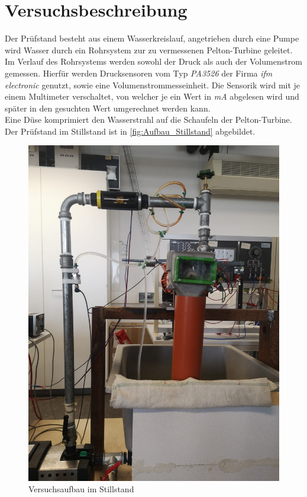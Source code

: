 \section{Versuchsbeschreibung}
\label{section:Versuchsbeschreibung}
%
Der Prüfstand besteht aus einem Wasserkreislauf, angetrieben durch eine Pumpe wird Wasser durch ein Rohrsystem zur zu vermessenen Pelton-Turbine geleitet.\\
Im Verlauf des Rohrsystems werden sowohl der Druck als auch der Volumenstrom gemessen.
Hierfür werden Drucksensoren vom Typ \textit{PA3526} der Firma \textit{ifm electronic} genutzt, sowie eine Volumenstrommesseinheit.
Die Sensorik wird mit je einem Multimeter verschaltet, von welcher je ein Wert in \textit{mA} abgelesen wird und später in den gesuchten Wert umgerechnet werden kann.\\
Eine Düse komprimiert den Wasserstrahl auf die Schaufeln der Pelton-Turbine.
Der Prüfstand im Stillstand ist in \autoref{fig:Aufbau_Stillstand} abgebildet.\\
%
\begin{figure}[!h]
    \centering
    \includegraphics[scale=0.15]{Abbildungen/Aufbau Pelton.jpeg}
    \caption{Versuchsaufbau im Stillstand}
    \label{fig:Aufbau_Stillstand}
\end{figure}

